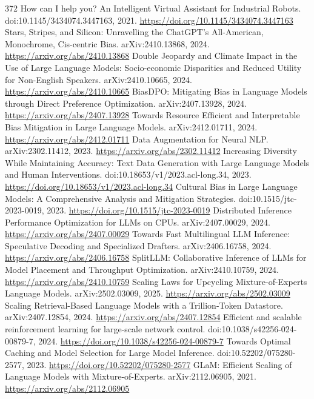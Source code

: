 \documentclass[11pt]{article}
\begin{document}
\begin{thebibliography}{372}
 How can I help you? An Intelligent Virtual Assistant for Industrial Robots. doi:10.1145/3434074.3447163, 2021. \url{https://doi.org/10.1145/3434074.3447163}
 Stars, Stripes, and Silicon: Unravelling the ChatGPT's All-American, Monochrome, Cis-centric Bias. arXiv:2410.13868, 2024. \url{https://arxiv.org/abs/2410.13868}
 Double Jeopardy and Climate Impact in the Use of Large Language Models: Socio-economic Disparities and Reduced Utility for Non-English Speakers. arXiv:2410.10665, 2024. \url{https://arxiv.org/abs/2410.10665}
 BiasDPO: Mitigating Bias in Language Models through Direct Preference Optimization. arXiv:2407.13928, 2024. \url{https://arxiv.org/abs/2407.13928}
 Towards Resource Efficient and Interpretable Bias Mitigation in Large Language Models. arXiv:2412.01711, 2024. \url{https://arxiv.org/abs/2412.01711}
 Data Augmentation for Neural NLP. arXiv:2302.11412, 2023. \url{https://arxiv.org/abs/2302.11412}
 Increasing Diversity While Maintaining Accuracy: Text Data Generation with Large Language Models and Human Interventions. doi:10.18653/v1/2023.acl-long.34, 2023. \url{https://doi.org/10.18653/v1/2023.acl-long.34}
 Cultural Bias in Large Language Models: A Comprehensive Analysis and Mitigation Strategies. doi:10.1515/jtc-2023-0019, 2023. \url{https://doi.org/10.1515/jtc-2023-0019}
 Distributed Inference Performance Optimization for LLMs on CPUs. arXiv:2407.00029, 2024. \url{https://arxiv.org/abs/2407.00029}
 Towards Fast Multilingual LLM Inference: Speculative Decoding and Specialized Drafters. arXiv:2406.16758, 2024. \url{https://arxiv.org/abs/2406.16758}
 SplitLLM: Collaborative Inference of LLMs for Model Placement and Throughput Optimization. arXiv:2410.10759, 2024. \url{https://arxiv.org/abs/2410.10759}
 Scaling Laws for Upcycling Mixture-of-Experts Language Models. arXiv:2502.03009, 2025. \url{https://arxiv.org/abs/2502.03009}
 Scaling Retrieval-Based Language Models with a Trillion-Token Datastore. arXiv:2407.12854, 2024. \url{https://arxiv.org/abs/2407.12854}
 Efficient and scalable reinforcement learning for large-scale network control. doi:10.1038/s42256-024-00879-7, 2024. \url{https://doi.org/10.1038/s42256-024-00879-7}
 Towards Optimal Caching and Model Selection for Large Model Inference. doi:10.52202/075280-2577, 2023. \url{https://doi.org/10.52202/075280-2577}
 GLaM: Efficient Scaling of Language Models with Mixture-of-Experts. arXiv:2112.06905, 2021. \url{https://arxiv.org/abs/2112.06905}

\end{thebibliography}
\end{document}

